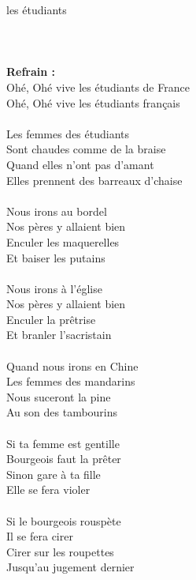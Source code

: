 
 les étudiants
\\\\\\\\\textbf{Refrain :}
\\Ohé, Ohé vive les étudiants de France
\\Ohé, Ohé vive les étudiants français
\\\\Les femmes des étudiants
\\Sont chaudes comme de la braise
\\Quand elles n'ont pas d'amant
\\Elles prennent des barreaux d'chaise
\\\\Nous irons au bordel
\\Nos pères y allaient bien
\\Enculer les maquerelles
\\Et baiser les putains
\\\\Nous irons à l'église
\\Nos pères y allaient bien
\\Enculer la prêtrise
\\Et branler l'sacristain
\\\\Quand nous irons en Chine
\\Les femmes des mandarins
\\Nous suceront la pine
\\Au son des tambourins
\\\\Si ta femme est gentille
\\Bourgeois faut la prêter
\\Sinon gare à ta fille
\\Elle se fera violer
\\\\Si le bourgeois rouspète
\\Il se fera cirer
\\Cirer sur les roupettes
\\Jusqu'au jugement dernier

\breakpage